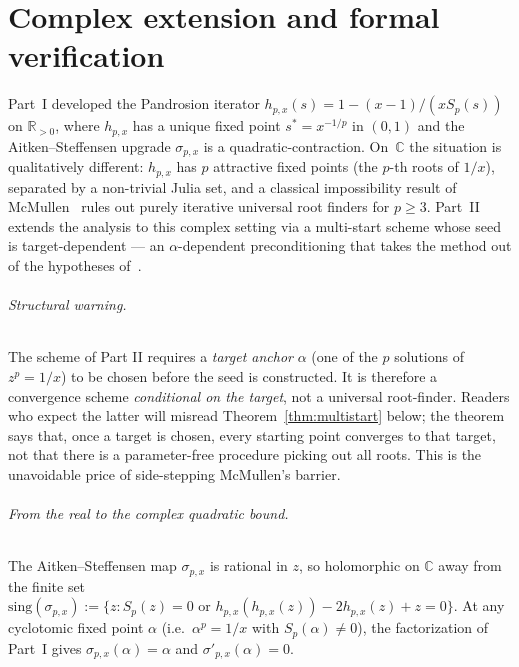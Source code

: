 \documentclass[11pt,a4paper]{article}
\theoremstyle{definition}
\begin{document}
\part{Complex extension and formal verification}

Part~I developed the Pandrosion iterator $h_{p,x}(s) = 1 - (x-1)/(x S_p(s))$ on $\mathbb{R}_{>0}$, where $h_{p,x}$ has a unique fixed point $s^\ast = x^{-1/p}$ in $(0,1)$ and the Aitken--Steffensen upgrade $\sigma_{p,x}$ is a quadratic-contraction. On~$\mathbb{C}$ the situation is qualitatively different: $h_{p,x}$ has $p$ attractive fixed points (the $p$-th roots of $1/x$), separated by a non-trivial Julia set, and a classical impossibility result of McMullen~\cite{mcmullen} rules out purely iterative universal root finders for $p \geq 3$. Part~II extends the analysis to this complex setting via a multi-start scheme whose seed is target-dependent --- an $\alpha$-dependent preconditioning that takes the method out of the hypotheses of~\cite{mcmullen}.

\paragraph{Structural warning.} The scheme of Part II requires a \emph{target anchor} $\alpha$ (one of the $p$ solutions of $z^p = 1/x$) to be chosen before the seed is constructed. It is therefore a convergence scheme \emph{conditional on the target}, not a universal root-finder. Readers who expect the latter will misread Theorem~\ref{thm:multistart} below; the theorem says that, once a target is chosen, every starting point converges to that target, not that there is a parameter-free procedure picking out all roots. This is the unavoidable price of side-stepping McMullen's barrier.

\paragraph{From the real to the complex quadratic bound.} The Aitken--Steffensen map $\sigma_{p,x}$ is rational in $z$, so holomorphic on $\mathbb{C}$ away from the finite set $\mathrm{sing}(\sigma_{p,x}) := \{z : S_p(z) = 0 \text{ or } h_{p,x}(h_{p,x}(z)) - 2h_{p,x}(z) + z = 0\}$. At any cyclotomic fixed point $\alpha$ (i.e.\ $\alpha^p = 1/x$ with $S_p(\alpha) \neq 0$), the factorization of Part~I gives $\sigma_{p,x}(\alpha) = \alpha$ and $\sigma'_{p,x}(\alpha) = 0$.
\end{document}
